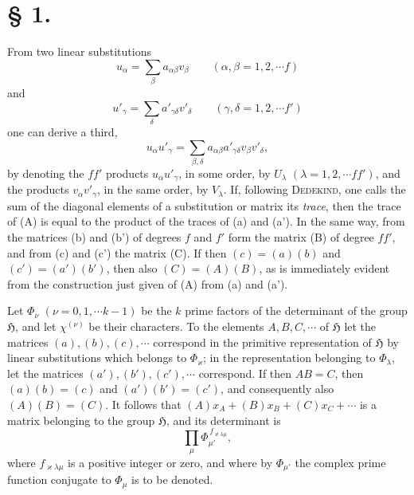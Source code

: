 \documentclass[11pt]{article}
\newcommand{\Hgr}{\mathfrak{H}}
\begin{document}
\section*{§ 1.}

From two linear substitutions
\begin{equation*}\tag{a}
u_\alpha=\sum_\beta a_{\alpha\beta}v_\beta\qquad(\alpha,\beta=1,2,\cdots f)
\end{equation*}
and
\begin{equation*}\tag{a'}
u'_\gamma=\sum_\delta a'_{\gamma\delta}v'_\delta\qquad(\gamma,\delta=1,2,\cdots f')
\end{equation*}
one can derive a third,
\begin{equation*}\tag{A}
u_\alpha u'_\gamma=\sum_{\beta,\delta}a_{\alpha\beta}a'_{\gamma\delta}v_\beta v'_\delta,
\end{equation*}
by denoting the $ff'$ products $u_\alpha u'_\gamma$, in some order, by $U_\lambda$ $(\lambda=1,2,\cdots ff')$, and the products $v_\alpha v'_\gamma$, in the same order, by $V_\lambda$. If, following \textsc{Dedekind}, one calls the sum of the diagonal elements of a substitution or matrix its \emph{trace}, then the trace of (A) is equal to the product of the traces of (a) and (a'). In the same way, from the matrices (b) and (b') of degrees $f$ and $f'$ form the matrix (B) of degree $ff'$, and from (c) and (c') the matrix (C). If then $(c)=(a)(b)$ and $(c')=(a')(b')$, then also $(C)=(A)(B)$, as is immediately evident from the construction just given of (A) from (a) and (a').

Let $\Phi_\nu$ $(\nu=0,1,\cdots k-1)$ be the $k$ prime factors of the determinant of the group $\Hgr$, and let $\chi^{(\nu)}$ be their characters. To the elements $A,B,C,\cdots$ of $\Hgr$ let the matrices $(a),(b),(c),\cdots$ correspond in the primitive representation of $\Hgr$ by linear substitutions which belongs to $\Phi_\varkappa$; in the representation belonging to $\Phi_\lambda$, let the matrices $(a'),(b'),(c'),\cdots$ correspond. If then $AB=C$, then $(a)(b)=(c)$ and $(a')(b')=(c')$, and consequently also $(A)(B)=(C)$. It follows that $(A)x_A+(B)x_B+(C)x_C+\cdots$ is a matrix belonging to the group $\Hgr$, and its determinant is
\begin{equation*}\tag{1.}
\prod_\mu \Phi_{\mu'}^{\,f_{\varkappa\lambda\mu}},
\end{equation*}
where $f_{\varkappa\lambda\mu}$ is a positive integer or zero, and where by $\Phi_{\mu'}$ the complex prime function conjugate to $\Phi_\mu$ is to be denoted.
\end{document}
